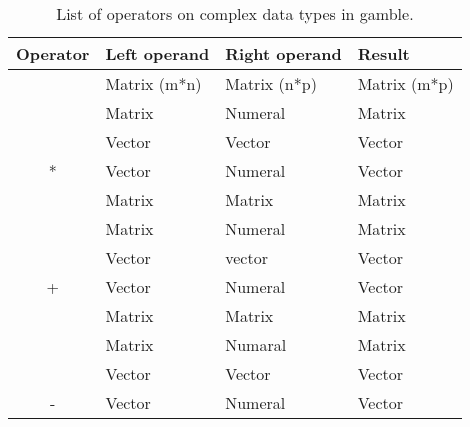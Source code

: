 \begin{table}[h]
\centering
\begin{tabular}{|c|l|l|l|}
\hline
\textbf{Operator}   & \textbf{Left operand}            & \textbf{Right operand}            & \textbf{Result}                 \\ \hline
                    & \cellcolor{gray!40}Matrix (m*n)  & \cellcolor{gray!40}Matrix (n*p)   & \cellcolor{gray!40}Matrix (m*p) \\ \cline{2-4} 
                    & Matrix                           & Numeral                           & Matrix                          \\ \cline{2-4}
                    & \cellcolor{gray!40}Vector        & \cellcolor{gray!40}Vector         & \cellcolor{gray!40}Vector       \\ \cline{2-4} 
\multirow{-4}{*}{*} & Vector                           & Numeral                           & Vector                          \\ \hline
                    & \cellcolor{gray!40}Matrix        & \cellcolor{gray!40}Matrix         & \cellcolor{gray!40}Matrix       \\ \cline{2-4}
                    & Matrix                           & Numeral                           & Matrix                          \\ \cline{2-4}
                    & \cellcolor{gray!40}Vector        & \cellcolor{gray!40}vector         & \cellcolor{gray!40}Vector       \\ \cline{2-4} 
\multirow{-4}{*}{+} & Vector                           & Numeral                           & Vector                          \\ \hline
                    & \cellcolor{gray!40}Matrix        & \cellcolor{gray!40}Matrix         & \cellcolor{gray!40}Matrix       \\ \cline{2-4}
                    & Matrix                           & Numaral                           & Matrix                          \\ \cline{2-4}
                    & \cellcolor{gray!40}Vector        & \cellcolor{gray!40}Vector         & \cellcolor{gray!40}Vector       \\ \cline{2-4} 
\multirow{-4}{*}{-} & Vector                           & Numeral                           & Vector                          \\ \hline
\end{tabular}
\caption{List of operators on complex data types in \gls{gamble}.}\label{tbl:matOps}
\end{table}